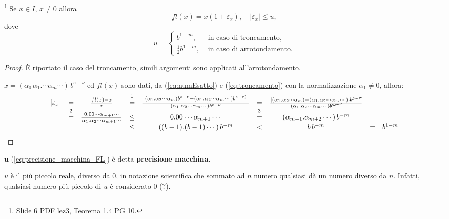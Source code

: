 \begin{theorem} \footnote{Slide 6 PDF lez3, Teorema 1.4 PG 10.}\label{th:precisione_macchina_FL}
	Se $x\in I,\, x\neq 0$ allora
	\begin{equation*}
		fl(x)=x(1+\varepsilon_x), \quad |\varepsilon_x|\leq u,
	\end{equation*}
	dove
	\begin{equation}\label{eq:precisione_macchina_FL}
		u=
		\begin{cases}
			b^{1-m}, &\text{ in caso di troncamento},\\
			\frac{1}{2}b^{1-m}, &\text{ in caso di arrotondamento}.
		\end{cases}
	\end{equation} 
\end{theorem}
\begin{proof}
	È riportato il caso del troncamento, simili argomenti sono applicati all'arrotondamento.
	
	$x=(\alpha_0\,\alpha_1.\cdots\alpha_m\cdots)\,b^{e-\nu}$ ed $fl(x)$ sono dati, da (\ref{eq:numEsatto}) e (\ref{eq:troncamento}) con la normalizzazione $\alpha_1\neq 0$, allora:
	\begin{equation*}
		\begin{matrix}
			|\varepsilon_x|&=&\frac{fl(x)-x}{x}&\overset{\footnotemark}{=}&\frac{\left|(\alpha_1.\alpha_2\cdots\alpha_m)b^{e-\nu}-(\alpha_1.\alpha_2\cdots\alpha_m\cdots)b^{e-\nu)}\right|}{(\alpha_1.\alpha_2\cdots\alpha_m\cdots)b^{e-\nu}}
			&=&\frac{|(\alpha_1.\alpha_2\cdots\alpha_m)-(\alpha_1.\alpha_2\cdots\alpha_m\cdots)|\cancel{b^{e-\nu}}}{(\alpha_1.\alpha_2\cdots\alpha_m\cdots)\cancel{b^{e-\nu}}}\\
			&\overset{\footnotemark}{=}&\frac{0.00\cdots\alpha_{m+1}\cdots}{\alpha_1.\alpha_2\cdots\alpha_{m+1}\cdots}&\leq& 0.00\cdots\alpha_{m+1}\cdots &\overset{\footnotemark}{=}&(\alpha_{m+1}.\alpha_{m+2}\cdots)\, b^{-m}\\
			&&&\leq&((b-1).(b-1)\cdots)\, b^{-m}&<&b\, b^{-m}&=& b^{1-m}
		\end{matrix}
	\end{equation*}
\end{proof}
\begin{definition}
	$\boldsymbol u$ (\ref{eq:precisione_macchina_FL}) è detta \textbf{precisione macchina}.
\end{definition}
$u$ è il più piccolo reale, diverso da 0, in notazione scientifica che sommato ad $n$ numero qualsiasi dà un numero diverso da $n$. Infatti, qualsiasi numero più piccolo di $u$ è considerato 0 (?).

